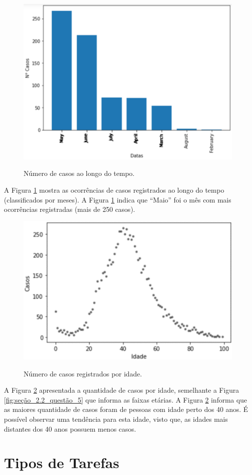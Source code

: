 \documentclass[12pt]{article}
\begin{document}
\begin{figure}[!ht]
  \centering
    \includegraphics[width=.5\linewidth]{Figuras/casos_por_mês.png} \\
  \caption{Número de casos ao longo do tempo.}
  \label{fig:seção_2.2_questão_6}
\end{figure}

A Figura \ref{fig:seção_2.2_questão_6} mostra as ocorrências de casos registrados ao longo do tempo (classificados por meses). A Figura \ref{fig:seção_2.2_questão_6} indica que ``Maio'' foi o mês com mais ocorrências registradas (mais de 250 casos).

\begin{figure}[!ht]
  \centering
    \includegraphics[width=.5\linewidth]{Figuras/casos_por_idade.png} \\
  \caption{Número de casos registrados por idade.}
  \label{fig:seção_2.2_questão_7}
\end{figure}

A Figura \ref{fig:seção_2.2_questão_7} apresentada a quantidade de casos por idade, semelhante a Figura \ref{fig:seção_2.2_questão_5} que informa as faixas etárias. A Figura \ref{fig:seção_2.2_questão_7} informa que as maiores quantidade de casos foram de pessoas com idade perto dos 40 anos. É possível observar uma tendência para esta idade, visto que, as idades mais distantes dos 40 anos possuem menos casos.

\section{Tipos de Tarefas}
\end{document}
